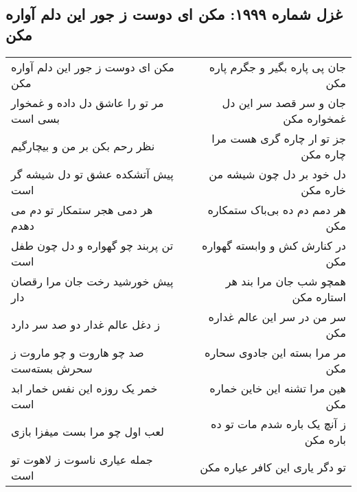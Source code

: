 \begin{center}
\section*{غزل شماره ۱۹۹۹: مکن ای دوست ز جور این دلم آواره مکن}
\label{sec:1999}
\begin{longtable}{l p{0.5cm} r}
مکن ای دوست ز جور این دلم آواره مکن
&&
جان پی پاره بگیر و جگرم پاره مکن
\\
مر تو را عاشق دل داده و غمخوار بسی است
&&
جان و سر قصد سر این دل غمخواره مکن
\\
نظر رحم بکن بر من و بیچارگیم
&&
جز تو ار چاره گری هست مرا چاره مکن
\\
پیش آتشکده عشق تو دل شیشه گر است
&&
دل خود بر دل چون شیشه من خاره مکن
\\
هر دمی هجر ستمکار تو دم می دهدم
&&
هر دمم دم ده بی‌باک ستمکاره مکن
\\
تن پربند چو گهواره و دل چون طفل است
&&
در کنارش کش و وابسته گهواره مکن
\\
پیش خورشید رخت جان مرا رقصان دار
&&
همچو شب جان مرا بند هر استاره مکن
\\
ز دغل عالم غدار دو صد سر دارد
&&
سر من در سر این عالم غداره مکن
\\
صد چو هاروت و چو ماروت ز سحرش بسته‌ست
&&
مر مرا بسته این جادوی سحاره مکن
\\
خمر یک روزه این نفس خمار ابد است
&&
هین مرا تشنه این خاین خماره مکن
\\
لعب اول چو مرا بست میفزا بازی
&&
ز آنچ یک باره شدم مات تو ده باره مکن
\\
جمله عیاری ناسوت ز لاهوت تو است
&&
تو دگر یاری این کافر عیاره مکن
\\
\end{longtable}
\end{center}
